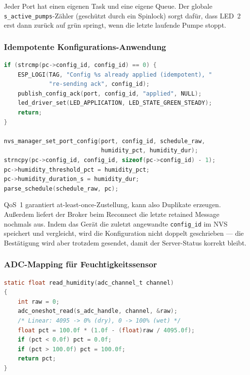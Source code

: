 \documentclass[a4paper,12pt]{article}
\begin{document}
Jeder Port hat einen eigenen Task und eine eigene Queue. Der globale
\texttt{s\_active\_pumps}-Zähler (geschützt durch ein Spinlock) sorgt
dafür, dass LED~2 erst dann zurück auf grün springt, wenn die letzte
laufende Pumpe stoppt.

\subsubsection{Idempotente Konfigurations-Anwendung}

\begin{lstlisting}[language=C, caption={Auszug aus
\texttt{mqtt\_manager.c} --- doppelte Konfigurationen werden erkannt.}]
if (strcmp(pc->config_id, config_id) == 0) {
    ESP_LOGI(TAG, "Config %s already applied (idempotent), "
             "re-sending ack", config_id);
    publish_config_ack(port, config_id, "applied", NULL);
    led_driver_set(LED_APPLICATION, LED_STATE_GREEN_STEADY);
    return;
}

nvs_manager_set_port_config(port, config_id, schedule_raw,
                            humidity_pct, humidity_dur);
strncpy(pc->config_id, config_id, sizeof(pc->config_id) - 1);
pc->humidity_threshold_pct = humidity_pct;
pc->humidity_duration_s = humidity_dur;
parse_schedule(schedule_raw, pc);
\end{lstlisting}

QoS~1 garantiert at-least-once-Zustellung, kann also Duplikate erzeugen.
Außerdem liefert der Broker beim Reconnect die letzte retained Message
nochmals aus. Indem das Gerät die zuletzt angewandte
\texttt{config\_id} im NVS speichert und vergleicht, wird die
Konfiguration nicht doppelt geschrieben --- die Bestätigung wird aber
trotzdem gesendet, damit der Server-Status korrekt bleibt.

\subsubsection{ADC-Mapping für Feuchtigkeitssensor}

\begin{lstlisting}[language=C, caption={Auszug aus
\texttt{mqtt\_manager.c} --- ADC-Rohwert in Prozent umrechnen.}]
static float read_humidity(adc_channel_t channel)
{
    int raw = 0;
    adc_oneshot_read(s_adc_handle, channel, &raw);
    /* Linear: 4095 -> 0% (dry), 0 -> 100% (wet) */
    float pct = 100.0f * (1.0f - (float)raw / 4095.0f);
    if (pct < 0.0f) pct = 0.0f;
    if (pct > 100.0f) pct = 100.0f;
    return pct;
}
\end{lstlisting}
\end{document}

